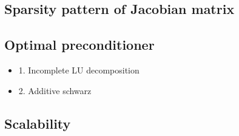\documentclass[smallextended]{svjour3}       %
\begin{document}
\subsection{Sparsity pattern of Jacobian matrix}

\subsection{Optimal preconditioner}

\begin{itemize}
					 \item 1. Incomplete LU decomposition
					 \item 2. Additive schwarz
\end{itemize}

\subsection{Scalability}
\end{document}
